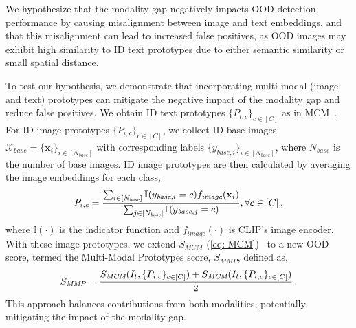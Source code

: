 We hypothesize that the modality gap negatively impacts OOD detection performance by causing misalignment between image and text embeddings, and that this misalignment can lead to increased false positives, as OOD images may exhibit high similarity to ID text prototypes due to either semantic similarity or small spatial distance. 

To test our hypothesis, we demonstrate that incorporating multi-modal (image and text) prototypes can mitigate the negative impact of the modality gap and reduce false positives. 
We obtain ID text prototypes $\{P_{t,c}\}_{c\in[C]}$ as in MCM~\cite{ming2022delving}. 
For ID image prototypes $\{P_{i,c}\}_{c\in[C]}$, we collect ID base images $\mathcal{X}_{\textit{base}} = \{\mathbf{x}_i\}_{i \in [N_{\textit{base}}]}$ with corresponding labels $\{y_{\textit{base}, i}\}_{i \in [N_{\textit{base}}]}$, where $N_{\textit{base}}$ is the number of base images. 
ID image prototypes are then calculated by averaging the image embeddings for each class,
\begin{equation}
\small
    \label{eq: image anchor}
    P_{i,c} = \frac{\sum_{i \in [N_{\textit{base}}]} \mathbb{I}(y_{\textit{base},i}=c) f_{\textit{image}}(\mathbf{x}_{i})}{\sum_{j \in [N_{\textit{base}}]} \mathbb{I}(y_{\textit{base},j}=c)} , \forall c \in [C]\,,
\end{equation}
where $\mathbb{I}(\cdot)$ is the indicator function and $f_{\textit{image}}(\cdot)$ is CLIP's image encoder. 
With these image prototypes, we extend $S_{\textit{MCM}}$ (\cref{eq: MCM})~\cite{ming2022delving} to a new OOD score, termed the Multi-Modal Prototypes score, $S_{\textit{MMP}}$, defined as,
\begin{equation}\label{eq: MMA}
\small
    S_{\textit{MMP}} %
    = \frac{S_{\textit{MCM}} (I_t, \{P_{i,c}\}_{c\in[C]}) + S_{\textit{MCM}} (I_t ,\{P_{t,c}\}_{c\in[C]})}{2} \,.
\end{equation}
This approach balances contributions from both modalities, potentially mitigating the impact of the modality gap.

